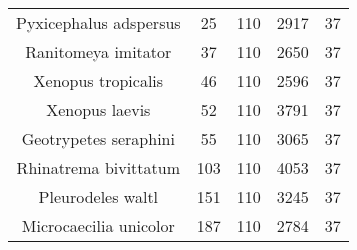 \begin{longtable}[c]{|c|c|c|c|c|}
Pyxicephalus adspersus  & 25  & 110 & 2917  & 37 \\
Ranitomeya imitator     & 37  & 110 & 2650  & 37 \\
Xenopus tropicalis      & 46  & 110 & 2596  & 37 \\
Xenopus laevis          & 52  & 110 & 3791  & 37 \\
Geotrypetes seraphini   & 55  & 110 & 3065  & 37 \\
Rhinatrema bivittatum   & 103 & 110 & 4053  & 37 \\
Pleurodeles waltl       & 151 & 110 & 3245  & 37 \\
Microcaecilia unicolor  & 187 & 110 & 2784  & 37 \\ \hline
\end{longtable}


